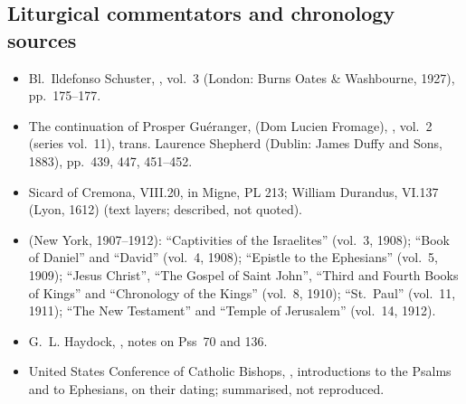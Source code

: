 {\subsection*{Liturgical commentators and chronology sources}
\begin{itemize}\setlength{\itemsep}{0.15em}\setlength{\parskip}{0pt}
\item Bl.\ Ildefonso Schuster, , vol.~3 (London: Burns Oates \& Washbourne, 1927), pp.~175--177.
\item The continuation of Prosper Guéranger,  (Dom Lucien Fromage), , vol.~2 (series vol.~11), trans. Laurence Shepherd (Dublin: James Duffy and Sons, 1883), pp.~439, 447, 451--452.
\item Sicard of Cremona,  VIII.20, in Migne, PL 213; William Durandus,  VI.137 (Lyon, 1612) (text layers; described, not quoted).
\item {} (New York, 1907--1912): ``Captivities of the Israelites'' (vol.~3, 1908); ``Book of Daniel'' and ``David'' (vol.~4, 1908); ``Epistle to the Ephesians'' (vol.~5, 1909); ``Jesus Christ'', ``The Gospel of Saint John'', ``Third and Fourth Books of Kings'' and ``Chronology of the Kings'' (vol.~8, 1910); ``St.\ Paul'' (vol.~11, 1911); ``The New Testament'' and ``Temple of Jerusalem'' (vol.~14, 1912).
\item G.~L. Haydock, , notes on Pss~70 and 136.
\item United States Conference of Catholic Bishops, , introductions to the Psalms and to Ephesians, on their dating; summarised, not reproduced.
\end{itemize}
\par}
